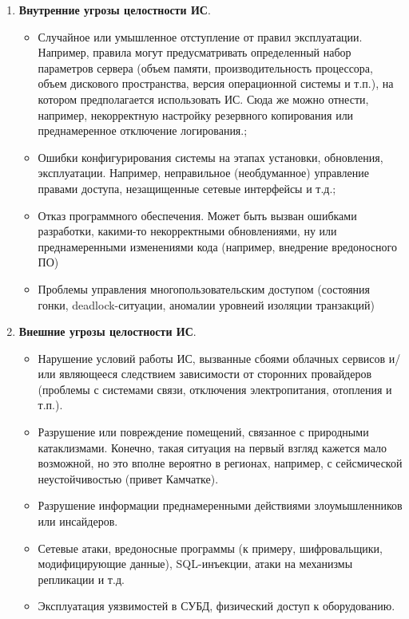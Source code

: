 \begin{enumerate}
\item \textbf{Внутренние угрозы целостности ИС}.
    \begin{itemize}
        \item Случайное или умышленное отступление от правил эксплуатации. Например, правила могут предусматривать определенный набор параметров сервера (объем памяти, производительность процессора, объем дискового пространства, версия операционной системы и т.п.), на котором предполагается использовать ИС. Сюда же можно отнести, например, некорректную настройку резервного копирования или преднамеренное отключение логирования.;
        \item Ошибки конфигурирования системы на этапах установки, обновления, эксплуатации. Например, неправильное (необдуманное) управление правами доступа, незащищенные сетевые интерфейсы и т.д.;
        \item Отказ программного обеспечения. Может быть вызван ошибками разработки, какими-то некорректными обновлениями, ну или преднамеренными изменениями кода (например, внедрение вредоносного ПО)
	    \item Проблемы управления многопользовательским доступом (состояния гонки, deadlock-ситуации, аномалии уровнеий изоляции транзакций)
    \end{itemize}

\item \textbf{Внешние угрозы целостности ИС}.
    \begin{itemize}
        \item Нарушение условий работы ИС, вызванные сбоями облачных сервисов и/или являющееся следствием зависимости от сторонних провайдеров (проблемы с системами связи, отключения электропитания, отопления и т.п.).
        \item Разрушение или повреждение помещений, связанное с природными катаклизмами. Конечно, такая ситуация на первый взгляд кажется мало возможной, но это вполне вероятно в регионах, например, с сейсмической неустойчивостью (привет Камчатке).
        \item Разрушение информации преднамеренными действиями злоумышленников или инсайдеров.
        \item Сетевые атаки, вредоносные программы (к примеру, шифровальщики, модифицирующие данные), SQL-инъекции, атаки на механизмы репликации и т.д.
	\item Эксплуатация уязвимостей в СУБД, физический доступ к оборудованию.
    \end{itemize}
\end{enumerate}

